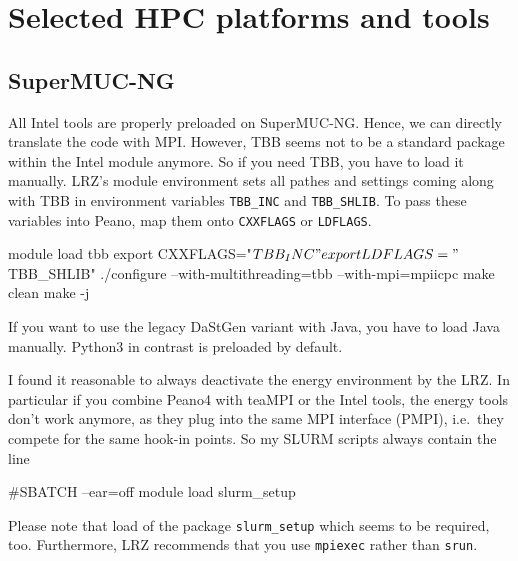 \chapter{Selected HPC platforms and tools}


\section{SuperMUC-NG}

% 

All Intel tools are properly preloaded on SuperMUC-NG.
Hence, we can directly translate the code with MPI. 
However, TBB seems not to be a standard package within the Intel module anymore. 
So if you need TBB, you have to load it manually.
LRZ's module environment sets all pathes and settings coming along with TBB in
environment variables \texttt{TBB\_INC} and \texttt{TBB\_SHLIB}.
To pass these variables into Peano, map them onto \texttt{CXXFLAGS} or
\texttt{LDFLAGS}.

\begin{code}
 module load tbb
 export CXXFLAGS="$TBB_INC"
 export LDFLAGS="$TBB_SHLIB"
 ./configure --with-multithreading=tbb --with-mpi=mpiicpc
 make clean
 make -j
\end{code}


\noindent
If you want to use the legacy DaStGen variant with Java, you have to load
Java manually.
Python3 in contrast is preloaded by default.


\begin{remark}
 I found it reasonable to always deactivate the energy environment by the LRZ.
 In particular if you combine Peano4 with teaMPI or the Intel tools, the energy
 tools don't work anymore, as they plug into the same MPI interface (PMPI),
 i.e.~they compete for the same hook-in points. So my SLURM scripts always
 contain the line
 \begin{code}
#SBATCH --ear=off
module load slurm_setup
 \end{code}
 Please note that load of the package \texttt{slurm\_setup} which seems to be
 required, too.
 Furthermore, LRZ recommends that you use \texttt{mpiexec} rather than
 \texttt{srun}.
\end{remark}



